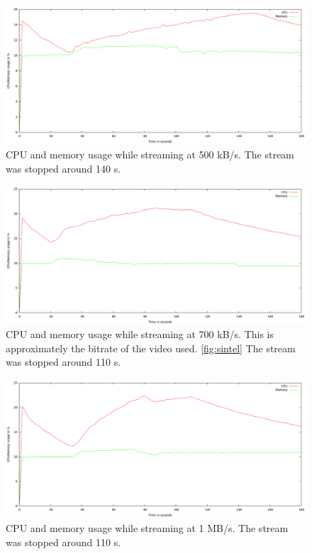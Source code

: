 \begin{center}
\begin{figure}[h]
	\centering
	\mbox{\includegraphics[width=1.2\textwidth]{Images/500kbs.png}}
	\caption{CPU and memory usage while streaming at 500 kB/s. The stream was stopped around 140 s.}
	\label{graph:500kbs}
\end{figure}
\end{center}

\begin{center}
\begin{figure}[h]
	\centering
	\mbox{\includegraphics[width=1.2\textwidth]{Images/700kbs.png}}
	\caption{CPU and memory usage while streaming at 700 kB/s. This is approximately the bitrate of the video used. \ref{fig:sintel}
	The stream was stopped around 110 s.}
	\label{graph:700kbs}
\end{figure}
\end{center}

\begin{center}
\begin{figure}[h]
	\centering
	\mbox{\includegraphics[width=1.2\textwidth]{Images/1000kbs.png}}
	\caption{CPU and memory usage while streaming at 1 MB/s. The stream was stopped around 110 s.}
	\label{graph:1Mbs}
\end{figure}
\end{center}
\clearpage

